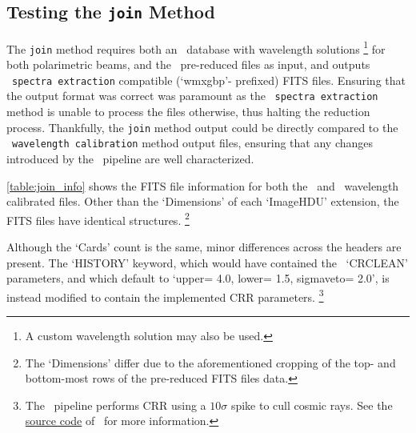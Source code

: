 \subsection{Testing the \texttt{join} Method} \label{subsec:test_join}

The \texttt{join} method requires both an \iraf\ database with wavelength solutions%
\footnote{A custom wavelength solution may also be used.}
for both polarimetric beams, and the \polsalt\ pre-reduced files as input,  and outputs \polsalt\ \texttt{spectra extraction} compatible (`wmxgbp'- prefixed) \gls{FITS} files.
Ensuring that the output format was correct was paramount as the \polsalt\ \texttt{spectra extraction} method is unable to process the files otherwise, thus halting the reduction process.
Thankfully, the \texttt{join} method output could be directly compared to the \polsalt\ \texttt{wavelength calibration} method output files, ensuring that any changes introduced by the \stops\ pipeline are well characterized.



\autoref{table:join_info} shows the \gls{FITS} file information for both the \polsalt\ and \stops\ wavelength calibrated files.
Other than the `Dimensions' of each `ImageHDU' extension, the \gls{FITS} files have identical structures.%
\footnote{The `Dimensions' differ due to the aforementioned cropping of the top- and bottom-most rows of the pre-reduced \gls{FITS} files data.}

Although the `Cards' count is the same, minor differences across the headers are present.
The `HISTORY' keyword, which would have contained the \polsalt\ `CRCLEAN' parameters, and which default to `upper= 4.0, lower= 1.5, sigmaveto= 2.0', is instead modified to contain the implemented \gls{CRR} parameters.%
\footnote{The \polsalt\ pipeline performs \gls{CRR} using a $10\sigma$ spike to cull cosmic rays. See the \protect\href{https://github.com/saltastro/polsalt/blob/master/polsalt/specpolwavmap.py\#L132}{source code} of \polsalt\ for more information.}

